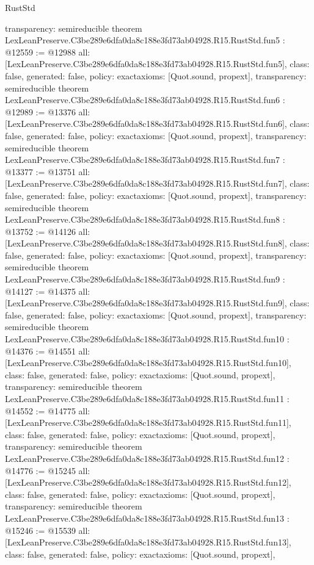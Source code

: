 \begin{lexlean}{RustStd}
\begin{coremodule}
{  transparency: semireducible
}
theorem LexLeanPreserve.C3be289e6dfa0da8c188e3fd73ab04928.R15.RustStd.fun5 : @12559 := @12988 {
  all: [LexLeanPreserve.C3be289e6dfa0da8c188e3fd73ab04928.R15.RustStd.fun5],
  class: false,
  generated: false,
  policy: exact{axioms: [Quot.sound, propext]},
  transparency: semireducible
}
theorem LexLeanPreserve.C3be289e6dfa0da8c188e3fd73ab04928.R15.RustStd.fun6 : @12989 := @13376 {
  all: [LexLeanPreserve.C3be289e6dfa0da8c188e3fd73ab04928.R15.RustStd.fun6],
  class: false,
  generated: false,
  policy: exact{axioms: [Quot.sound, propext]},
  transparency: semireducible
}
theorem LexLeanPreserve.C3be289e6dfa0da8c188e3fd73ab04928.R15.RustStd.fun7 : @13377 := @13751 {
  all: [LexLeanPreserve.C3be289e6dfa0da8c188e3fd73ab04928.R15.RustStd.fun7],
  class: false,
  generated: false,
  policy: exact{axioms: [Quot.sound, propext]},
  transparency: semireducible
}
theorem LexLeanPreserve.C3be289e6dfa0da8c188e3fd73ab04928.R15.RustStd.fun8 : @13752 := @14126 {
  all: [LexLeanPreserve.C3be289e6dfa0da8c188e3fd73ab04928.R15.RustStd.fun8],
  class: false,
  generated: false,
  policy: exact{axioms: [Quot.sound, propext]},
  transparency: semireducible
}
theorem LexLeanPreserve.C3be289e6dfa0da8c188e3fd73ab04928.R15.RustStd.fun9 : @14127 := @14375 {
  all: [LexLeanPreserve.C3be289e6dfa0da8c188e3fd73ab04928.R15.RustStd.fun9],
  class: false,
  generated: false,
  policy: exact{axioms: [Quot.sound, propext]},
  transparency: semireducible
}
theorem LexLeanPreserve.C3be289e6dfa0da8c188e3fd73ab04928.R15.RustStd.fun10 : @14376 := @14551 {
  all: [LexLeanPreserve.C3be289e6dfa0da8c188e3fd73ab04928.R15.RustStd.fun10],
  class: false,
  generated: false,
  policy: exact{axioms: [Quot.sound, propext]},
  transparency: semireducible
}
theorem LexLeanPreserve.C3be289e6dfa0da8c188e3fd73ab04928.R15.RustStd.fun11 : @14552 := @14775 {
  all: [LexLeanPreserve.C3be289e6dfa0da8c188e3fd73ab04928.R15.RustStd.fun11],
  class: false,
  generated: false,
  policy: exact{axioms: [Quot.sound, propext]},
  transparency: semireducible
}
theorem LexLeanPreserve.C3be289e6dfa0da8c188e3fd73ab04928.R15.RustStd.fun12 : @14776 := @15245 {
  all: [LexLeanPreserve.C3be289e6dfa0da8c188e3fd73ab04928.R15.RustStd.fun12],
  class: false,
  generated: false,
  policy: exact{axioms: [Quot.sound, propext]},
  transparency: semireducible
}
theorem LexLeanPreserve.C3be289e6dfa0da8c188e3fd73ab04928.R15.RustStd.fun13 : @15246 := @15539 {
  all: [LexLeanPreserve.C3be289e6dfa0da8c188e3fd73ab04928.R15.RustStd.fun13],
  class: false,
  generated: false,
  policy: exact{axioms: [Quot.sound, propext]},
}
\end{coremodule}
\end{lexlean}
